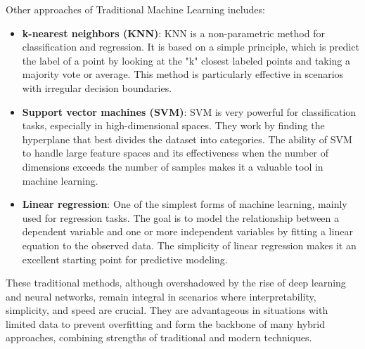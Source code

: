 \documentclass[12pt]{article}
\begin{document}
Other approaches of Traditional Machine Learning includes:
\begin{itemize}
    \item \textbf{k-nearest neighbors (KNN)}: KNN is a non-parametric method for classification and regression. It is based on a simple principle, which is predict the label of a point by looking at the "k" closest labeled points and taking a majority vote or average. This method is particularly effective in scenarios with irregular decision boundaries.


    \item \textbf{Support vector machines (SVM)}: SVM is very powerful for classification tasks, especially in high-dimensional spaces. They work by finding the hyperplane that best divides the dataset into categories. The ability of SVM to handle large feature spaces and its effectiveness when the number of dimensions exceeds the number of samples makes it a valuable tool in machine learning.

    \item \textbf{Linear regression}: One of the simplest forms of machine learning, mainly used for regression tasks. The goal is to model the relationship between a dependent variable and one or more independent variables by fitting a linear equation to the observed data. The simplicity of linear regression makes it an excellent starting point for predictive modeling.
\end{itemize}
These traditional methods, although overshadowed by the rise of deep learning and neural networks, remain integral in scenarios where interpretability, simplicity, and speed are crucial. They are advantageous in situations with limited data to prevent overfitting and form the backbone of many hybrid approaches, combining strengths of traditional and modern techniques.
\end{document}
